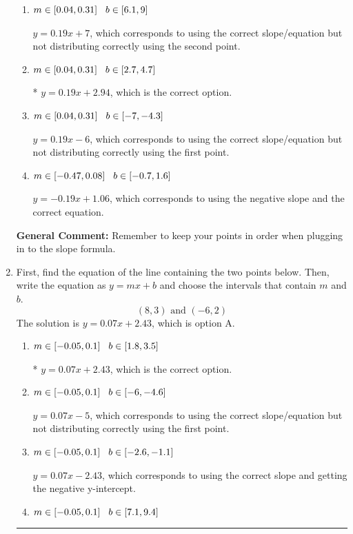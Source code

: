 \documentclass{extbook}[14pt]
\newcommand{\litem}[1]{\item #1

\rule{\textwidth}{0.4pt}}
\begin{document}
\begin{enumerate}
{\begin{enumerate}[label=\Alph*.]
 $y = 0.19x -2.94$, which corresponds to using the correct slope and getting the negative y-intercept.
\item \( m \in [0.04, 0.31] \hspace*{3mm} b \in [6.1, 9] \)

 $y = 0.19x + 7$, which corresponds to using the correct slope/equation but not distributing correctly using the second point.
\item \( m \in [0.04, 0.31] \hspace*{3mm} b \in [2.7, 4.7] \)

* $y = 0.19x + 2.94$, which is the correct option.
\item \( m \in [0.04, 0.31] \hspace*{3mm} b \in [-7, -4.3] \)

 $y = 0.19x -6$, which corresponds to using the correct slope/equation but not distributing correctly using the first point.
\item \( m \in [-0.47, 0.08] \hspace*{3mm} b \in [-0.7, 1.6] \)

 $y = -0.19x + 1.06$, which corresponds to using the negative slope and the correct equation.
\end{enumerate}

\textbf{General Comment:} Remember to keep your points in order when plugging in to the slope formula.
}
\litem{
First, find the equation of the line containing the two points below. Then, write the equation as $ y=mx+b $ and choose the intervals that contain $m$ and $b$.
\[ (8, 3) \text{ and } (-6, 2) \]The solution is \( y = 0.07x + 2.43 \), which is option A.\begin{enumerate}[label=\Alph*.]
\item \( m \in [-0.05, 0.1] \hspace*{3mm} b \in [1.8, 3.5] \)

* $y = 0.07x + 2.43$, which is the correct option.
\item \( m \in [-0.05, 0.1] \hspace*{3mm} b \in [-6, -4.6] \)

 $y = 0.07x -5$, which corresponds to using the correct slope/equation but not distributing correctly using the first point.
\item \( m \in [-0.05, 0.1] \hspace*{3mm} b \in [-2.6, -1.1] \)

 $y = 0.07x -2.43$, which corresponds to using the correct slope and getting the negative y-intercept.
\item \( m \in [-0.05, 0.1] \hspace*{3mm} b \in [7.1, 9.4] \)


\end{enumerate}}
\end{enumerate}
\end{document}
